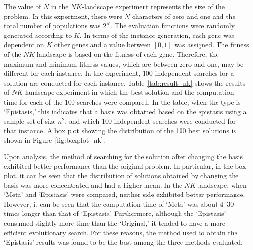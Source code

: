 The value of $ N $ in the $ NK $-landscape experiment represents the size of the problem. In this experiment, there were $ N $ characters of zero and one and the total number of populations was $ 2^N $. The evaluation functions were randomly generated according to $ K $. In terms of the instance generation, each gene was dependent on $ K $ other genes and a value between $ \left[0,1\right] $ was assigned. The fitness of the $ NK $-landscape is based on the fitness of each gene. Therefore, the maximum and minimum fitness values, which are between zero and one, may be different for each instance. In the experiment, 100 independent searches for a solution are conducted for each instance. Table~\ref{tab:result_nk} shows the results of $ NK $-landscape experiment in which the best solution and the computation time for each of the 100 searches were compared. In the table, when the type is `Epistasis,' this indicates that a basis was obtained based on the epistasis using a sample set of size $ n^2 $, and which 100 independent searches were conducted for that instance. A box plot showing the distribution of the 100 best solutions is shown in Figure~\ref{fig:boxplot_nk}.

Upon analysis, the method of searching for the solution after changing the basis exhibited better performance than the original problem. In particular, in the box plot, it can be seen that the distribution of solutions obtained by changing the basis was more concentrated and had a higher mean. In the $ NK $-landscape, when `Meta' and `Epistasis' were compared, neither side exhibited better performance. However, it can be seen that the computation time of ‘Meta’ was about 4–30 times longer than that of `Epistasis.' Furthermore, although the `Epistasis' consumed slightly more time than the `Original,' it tended to have a more efficient evolutionary search. For these reasons, the method used to obtain the `Epistasis' results was found to be the best among the three methods evaluated.


